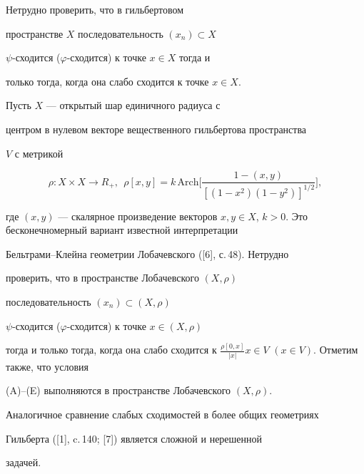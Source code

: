 \begin{exam}


Нетрудно проверить, что в гильбертовом


пространстве $X$ последовательность $(x_{n}) \subset X$


$\psi$-сходится ($\varphi$-сходится) к точке $x \in X$ тогда и


только тогда, когда она слабо сходится к точке $x \in X$.


\end{exam}





\begin{exam}


Пусть $X$ --- открытый шар единичного радиуса с


центром в нулевом векторе вещественного гильбертова пространства


$V$ с метрикой


$$


\rho : X \times X\rightarrow R_{+},\ \ \rho [x,y] =


k\,\mathrm{Arch}\bigg[\frac{1 - (x,y)}{[(1 - x^{2})(1 - y^{2})]^{1/2}}\bigg],


$$


где $(x,y)$ --- скалярное произведение векторов $x, y \in X$, $k


>0$. Это бесконечномерный вариант известной интерпретации


Бельтрами--Клейна геометрии Лобачевского ([6], с.\,48). Нетрудно


проверить, что в пространстве Лобачевского $(X,\rho)$


последовательность $(x_{n}) \subset (X,\rho)$


$\psi$-сходится ($\varphi$-сходится) к точке $x \in (X,\rho)$


тогда и только тогда, когда она слабо сходится к $\frac{\rho


[0,x]}{|x|} x \in V$  $(x \in V)$. Отметим также, что условия


(A)--(E) выполняются в пространстве Лобачевского $(X,\rho)$.


Аналогичное сравнение слабых сходимостей в более общих геометриях


Гильберта ([1], c.\,140; [7]) является сложной и нерешенной


задачей.


\end{exam}





